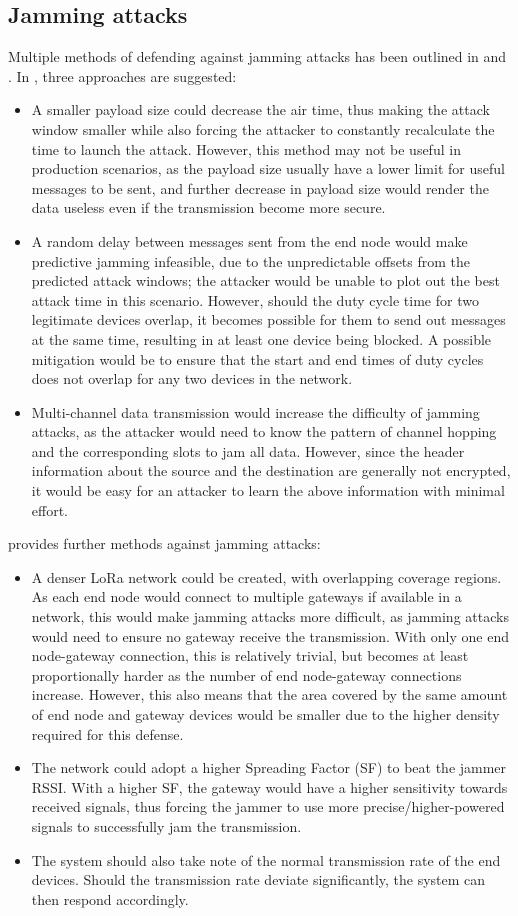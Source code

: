 \documentclass{article}
\begin{document}
\subsection{Jamming attacks}
Multiple methods of defending against jamming attacks has been outlined in \cite{ref1} and \cite{ref2}. In \cite{ref1}, three approaches are suggested:
\begin{itemize}
\item{
A smaller payload size could decrease the air time, thus making the attack window smaller while also forcing the attacker to constantly recalculate the time to launch the attack. However, this method may not be useful in production scenarios, as the payload size usually have a lower limit for useful messages to be sent, and further decrease in payload size would render the data useless even if the transmission become more secure.
}
\item{
A random delay between messages sent from the end node would make predictive jamming infeasible, due to the unpredictable offsets from the predicted attack windows; the attacker would be unable to plot out the best attack time in this scenario. However, should the duty cycle time for two legitimate devices overlap, it becomes possible for them to send out messages at the same time, resulting in at least one device being blocked. A possible mitigation would be to ensure that the start and end times of duty cycles does not overlap for any two devices in the network.
}
\item{
Multi-channel data transmission would increase the difficulty of jamming attacks, as the attacker would need to know the pattern of channel hopping and the corresponding slots to jam all data. However, since the header information about the source and the destination are generally not encrypted, it would be easy for an attacker to learn the above information with minimal effort.
}
\end{itemize}
\cite{ref2} provides further methods against jamming attacks:
\begin{itemize}
\item{A denser LoRa network could be created, with overlapping coverage regions. As each end node would connect to multiple gateways if available in a network, this would make jamming attacks more difficult, as jamming attacks would need to ensure no gateway receive the transmission. With only one end node-gateway connection, this is relatively trivial, but becomes at least proportionally harder as the number of end node-gateway connections increase. However, this also means that the area covered by the same amount of end node and gateway devices would be smaller due to the higher density required for this defense.}
\item{The network could adopt a higher Spreading Factor (SF) to beat the jammer RSSI. With a higher SF, the gateway would have a higher sensitivity towards received signals, thus forcing the jammer to use more precise/higher-powered signals to successfully jam the transmission.}
\item{The system should also take note of the normal transmission rate of the end devices. Should the transmission rate deviate significantly, the system can then respond accordingly.}
\end{itemize}
\end{document}
